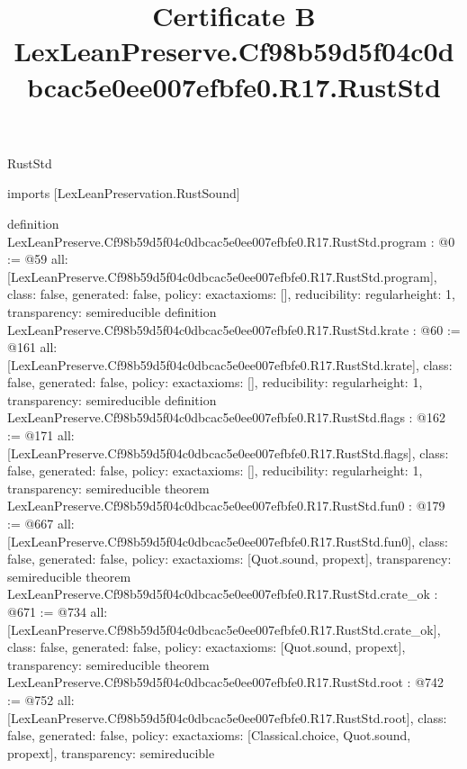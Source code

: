 \begin{lexlean}{RustStd}
\title{Certificate B LexLeanPreserve.Cf98b59d5f04c0dbcac5e0ee007efbfe0.R17.RustStd}
\begin{coremodule}
imports [LexLeanPreservation.RustSound]

definition LexLeanPreserve.Cf98b59d5f04c0dbcac5e0ee007efbfe0.R17.RustStd.program : @0 := @59 {
  all: [LexLeanPreserve.Cf98b59d5f04c0dbcac5e0ee007efbfe0.R17.RustStd.program],
  class: false,
  generated: false,
  policy: exact{axioms: []},
  reducibility: regular{height: 1},
  transparency: semireducible
}
definition LexLeanPreserve.Cf98b59d5f04c0dbcac5e0ee007efbfe0.R17.RustStd.krate : @60 := @161 {
  all: [LexLeanPreserve.Cf98b59d5f04c0dbcac5e0ee007efbfe0.R17.RustStd.krate],
  class: false,
  generated: false,
  policy: exact{axioms: []},
  reducibility: regular{height: 1},
  transparency: semireducible
}
definition LexLeanPreserve.Cf98b59d5f04c0dbcac5e0ee007efbfe0.R17.RustStd.flags : @162 := @171 {
  all: [LexLeanPreserve.Cf98b59d5f04c0dbcac5e0ee007efbfe0.R17.RustStd.flags],
  class: false,
  generated: false,
  policy: exact{axioms: []},
  reducibility: regular{height: 1},
  transparency: semireducible
}
theorem LexLeanPreserve.Cf98b59d5f04c0dbcac5e0ee007efbfe0.R17.RustStd.fun0 : @179 := @667 {
  all: [LexLeanPreserve.Cf98b59d5f04c0dbcac5e0ee007efbfe0.R17.RustStd.fun0],
  class: false,
  generated: false,
  policy: exact{axioms: [Quot.sound, propext]},
  transparency: semireducible
}
theorem LexLeanPreserve.Cf98b59d5f04c0dbcac5e0ee007efbfe0.R17.RustStd.crate_ok : @671 := @734 {
  all: [LexLeanPreserve.Cf98b59d5f04c0dbcac5e0ee007efbfe0.R17.RustStd.crate_ok],
  class: false,
  generated: false,
  policy: exact{axioms: [Quot.sound, propext]},
  transparency: semireducible
}
theorem LexLeanPreserve.Cf98b59d5f04c0dbcac5e0ee007efbfe0.R17.RustStd.root : @742 := @752 {
  all: [LexLeanPreserve.Cf98b59d5f04c0dbcac5e0ee007efbfe0.R17.RustStd.root],
  class: false,
  generated: false,
  policy: exact{axioms: [Classical.choice, Quot.sound, propext]},
  transparency: semireducible
}


\end{coremodule}
\end{lexlean}
